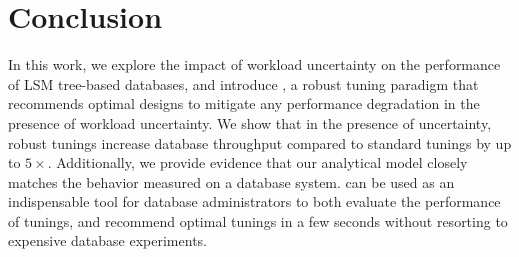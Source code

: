 
\section{Conclusion}
\label{sec:conclusion}

In this work, we explore the impact of workload uncertainty on the performance
    of LSM tree-based databases, and introduce {\Endure}, a robust tuning
    paradigm that recommends optimal designs to mitigate any performance
    degradation in the presence of workload uncertainty.
We show that in the presence of uncertainty, robust tunings increase database
    throughput compared to standard tunings by up to $5 \times$.
Additionally, we provide evidence that our analytical model closely matches the
    behavior measured on a database system.
{\Endure} can be used as an indispensable tool for database administrators
    to both evaluate the performance of tunings, and recommend optimal tunings
    in a few seconds without resorting to expensive database experiments.
